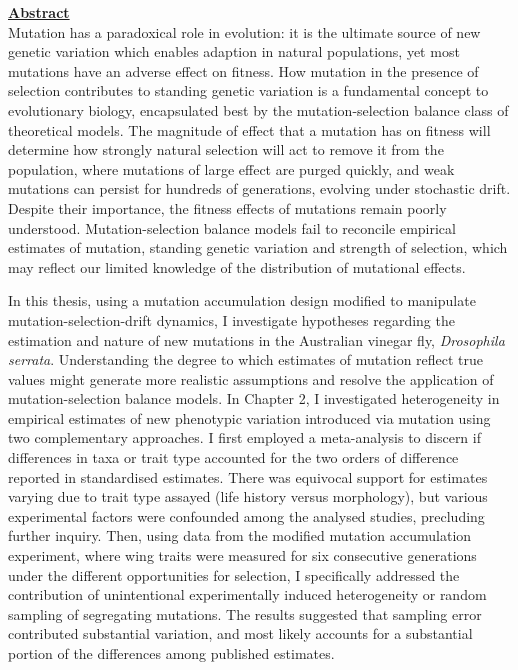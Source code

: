\noindent\textbf{\underline{Abstract}}\\

\noindent Mutation has a paradoxical role in evolution: it is the ultimate source of new genetic variation which enables adaption in natural populations, yet most mutations have an adverse effect on fitness. How mutation in the presence of selection contributes to standing genetic variation is a fundamental concept to evolutionary biology, encapsulated best by the mutation-selection balance class of theoretical models. The magnitude of effect that a mutation has on fitness will determine how strongly natural selection will act to remove it from the population, where mutations of large effect are purged quickly, and weak mutations can persist for hundreds of generations, evolving under stochastic drift. Despite their importance, the fitness effects of mutations remain poorly understood. Mutation-selection balance models fail to reconcile empirical estimates of mutation, standing genetic variation and strength of selection, which may reflect our limited knowledge of the distribution of mutational effects.\par

In this thesis, using a mutation accumulation design modified to manipulate mutation-selection-drift dynamics, I investigate hypotheses regarding the estimation and nature of new mutations in the Australian vinegar fly, \textit{Drosophila serrata}. Understanding the degree to which estimates of mutation reflect true values might generate more realistic assumptions and resolve the application of mutation-selection balance models. In Chapter 2, I investigated heterogeneity in empirical estimates of new phenotypic variation introduced via mutation using two complementary approaches. I first employed a meta-analysis to discern if differences in taxa or trait type accounted for the two orders of difference reported in standardised estimates. There was equivocal support for estimates varying due to trait type assayed (life history versus morphology), but various experimental factors were confounded among the analysed studies, precluding further inquiry. Then, using data from the modified mutation accumulation experiment, where wing traits were measured for six consecutive generations under the different opportunities for selection, I specifically addressed the contribution of unintentional experimentally induced heterogeneity or random sampling of segregating mutations. The results suggested that sampling error contributed substantial variation, and most likely accounts for a substantial portion of the differences among published estimates.\par

